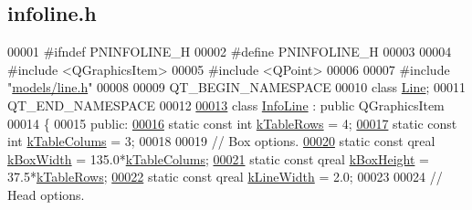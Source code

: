\hypertarget{infoline_8h_source}{}\subsection{infoline.\+h}
\label{infoline_8h_source}

\begin{DoxyCode}
00001 \textcolor{preprocessor}{#ifndef PNINFOLINE\_H}
00002 \textcolor{preprocessor}{#define PNINFOLINE\_H}
00003 
00004 \textcolor{preprocessor}{#include <QGraphicsItem>}
00005 \textcolor{preprocessor}{#include <QPoint>}
00006 
00007 \textcolor{preprocessor}{#include "\hyperlink{line_8h}{models/line.h}"}
00008 
00009 QT\_BEGIN\_NAMESPACE
00010 \textcolor{keyword}{class }\hyperlink{class_line}{Line};
00011 QT\_END\_NAMESPACE
00012 
\hypertarget{infoline_8h_source_l00013}{}\hyperlink{class_info_line}{00013} \textcolor{keyword}{class }\hyperlink{class_info_line}{InfoLine} : \textcolor{keyword}{public} QGraphicsItem
00014 \{
00015 \textcolor{keyword}{public}:
\hypertarget{infoline_8h_source_l00016}{}\hyperlink{class_info_line_a95cdc7a95cde6db7c6faceda995d26b9}{00016}   \textcolor{keyword}{static} \textcolor{keyword}{const} \textcolor{keywordtype}{int} \hyperlink{class_info_line_a95cdc7a95cde6db7c6faceda995d26b9}{kTableRows} = 4;
\hypertarget{infoline_8h_source_l00017}{}\hyperlink{class_info_line_a9fc071b08eb913cf3afc623835ad2fd8}{00017}   \textcolor{keyword}{static} \textcolor{keyword}{const} \textcolor{keywordtype}{int} \hyperlink{class_info_line_a9fc071b08eb913cf3afc623835ad2fd8}{kTableColums} = 3;
00018 
00019   \textcolor{comment}{// Box options.}
\hypertarget{infoline_8h_source_l00020}{}\hyperlink{class_info_line_af71f2b91ea77398bd770b973b71e2896}{00020}   \textcolor{keyword}{static} \textcolor{keyword}{const} qreal \hyperlink{class_info_line_af71f2b91ea77398bd770b973b71e2896}{kBoxWidth} = 135.0*\hyperlink{class_info_line_a9fc071b08eb913cf3afc623835ad2fd8}{kTableColums};
\hypertarget{infoline_8h_source_l00021}{}\hyperlink{class_info_line_a279cafcac8d844a00bd27dde524102dd}{00021}   \textcolor{keyword}{static} \textcolor{keyword}{const} qreal \hyperlink{class_info_line_a279cafcac8d844a00bd27dde524102dd}{kBoxHeight} = 37.5*\hyperlink{class_info_line_a95cdc7a95cde6db7c6faceda995d26b9}{kTableRows};
\hypertarget{infoline_8h_source_l00022}{}\hyperlink{class_info_line_a18390d54c56cd68cf6e767a5df7404d8}{00022}   \textcolor{keyword}{static} \textcolor{keyword}{const} qreal \hyperlink{class_info_line_a18390d54c56cd68cf6e767a5df7404d8}{kLineWidth} = 2.0;
00023 
00024   \textcolor{comment}{// Head options.}

\end{DoxyCode}
